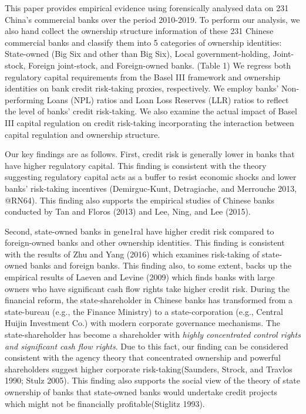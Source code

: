 \documentclass{article}
\begin{document}
This paper provides empirical evidence using forensically analysed data
on 231 China's commercial banks over the period 2010-2019. To perform
our analysis, we also hand collect the ownership structure information
of these 231 Chinese commercial banks and classify them into 5
categories of ownership identities: State-owned (Big Six and other than
Big Six), Local government-holding, Joint-stock, Foreign joint-stock,
and Foreign-owned banks. (Table 1) We regress both regulatory capital
requirements from the Basel III framework and ownership identities on
bank credit risk-taking proxies, respectively. We employ banks'
Non-performing Loans (NPL) ratios and Loan Loss Reserves (LLR) ratios to
reflect the level of banks' credit risk-taking. We also examine the
actual impact of Basel III capital regulation on credit risk-taking
incorporating the interaction between capital regulation and ownership
structure.

Our key findings are as follows. First, credit risk is generally lower
in banks that have higher regulatory capital. This finding is consistent
with the theory suggesting regulatory capital acts as a buffer to resist
economic shocks and lower banks' risk-taking incentives (Demirguc-Kunt,
Detragiache, and Merrouche 2013, @RN64). This finding also supports the
empirical studies of Chinese banks conducted by Tan and Floros (2013)
and Lee, Ning, and Lee (2015).

Second, state-owned banks in gene1ral have higher credit risk compared
to foreign-owned banks and other ownership identities. This finding is
consistent with the results of Zhu and Yang (2016) which examines
risk-taking of state-owned banks and foreign banks. This finding also,
to some extent, backs up the empirical results of Laeven and Levine
(2009) which finds banks with large owners who have significant cash
flow rights take higher credit risk. During the financial reform, the
state-shareholder in Chinese banks has transformed from a state-bureau
(e.g., the Finance Ministry) to a state-corporation (e.g., Central
Huijin Investment Co.) with modern corporate governance mechanisms. The
state-shareholder has become a shareholder with \emph{highly
concentrated control rights and significant cash flow rights}. Due to
this fact, our finding can be considered consistent with the agency
theory that concentrated ownership and powerful shareholders suggest
higher corporate risk-taking(Saunders, Strock, and Travlos 1990; Stulz
2005). This finding also supports the social view of the theory of state
ownership of banks that state-owned banks would undertake credit
projects which might not be financially profitable(Stiglitz 1993).
\end{document}
